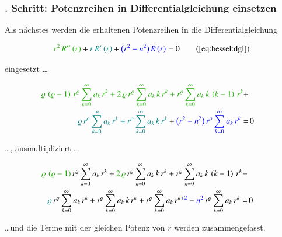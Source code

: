 \subsubsection{. Schritt: Potenzreihen in Differentialgleichung  einsetzen}
\begin{normalsize}%
Als n\"achstes werden die erhaltenen Potenzreihen in die Differentialgleichung
\end{normalsize}
\begin{align*}
	\textcolor{mygreen}{r^2 \, R'' \left( r \right)}
	+
	\textcolor{teal}{r \, R' \left( r \right)}
	+
	\textcolor{blue}{\big( r^2 - n^2 \big) \, R \left( r \right)}
	=
	0
	\tag{\ref{eq:bessel:dgl}}
\end{align*}
\begin{normalsize}%
eingesetzt \dots
\end{normalsize}
\begin{align*}	
	\textcolor{mygreen}{
		\varrho \, \left( \varrho - 1 \right) \, r^{\varrho}
		\sum_{k=0}^{\infty} a_k \, r^k
		+
		2 \, \varrho \, r^{\varrho}
		\sum_{k=0}^{\infty} a_k \, k \, r^k
		+
		r^{\varrho}
		\sum_{k=0}^{\infty} a_k \, k \, \left( k - 1 \right) \, r^k
	}
	+ \\
	\textcolor{teal}{
		\varrho \, r^{\varrho}
		\sum_{k=0}^{\infty} a_k \, r^k
		+
		r^{\varrho}
		\sum_{k=0}^{\infty} a_k \, k \, r^k
	}
	+ 
	\textcolor{blue}{
		\big(
		r^2 - n^2
		\big) \,
		r^{\varrho}
		\sum_{k=0}^{\infty} a_k \, r^k
	}
	= & \, 0
\end{align*}
\begin{normalsize}%
\dots , ausmultipliziert \dots
\end{normalsize}
\begin{align*}
	\textcolor{mygreen}{	\varrho \, \left( \varrho - 1 \right)} 
	\, r^{\varrho}
	\sum_{k=0}^{\infty} a_k \, r^k
	+
	\textcolor{mygreen}{2 \, \varrho}
	\, r^{\varrho}
	\sum_{k=0}^{\infty} a_k \, k \, r^k
	+
	r^{\varrho}
	\sum_{k=0}^{\infty} a_k \, k \, \left( k - 1 \right) \, r^k
	+ \\
	\textcolor{teal}{\varrho}
	\, r^{\varrho}
	\sum_{k=0}^{\infty} a_k \, r^k
	+
	r^{\varrho}
	\sum_{k=0}^{\infty} a_k \, k \, r^k
	+
	r^{\varrho}
		\sum_{k=0}^{\infty} a_k \, r^{k \textcolor{blue}{+ 2}}
	-
	\textcolor{blue}{n^2}
	\, r^{\varrho}
	\sum_{k=0}^{\infty} a_k \, r^k
	= & \, 0
\end{align*}
\begin{normalsize}%
\dots und die Terme mit der gleichen Potenz von $r$ werden zusammengefasst.
\end{normalsize}
